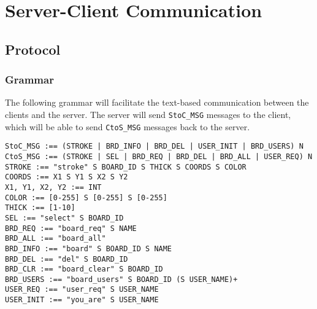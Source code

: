 \section{Server-Client Communication}

\subsection{Protocol}

\subsubsection{Grammar}
The following grammar will facilitate the text-based communication between the clients and the server. The server will send \texttt{StoC\_MSG} messages to the client, which will be able to send \texttt{CtoS\_MSG} messages back to the server.

\vspace{5mm}

\setlength{\parindent}{0in}

\texttt{StoC\_MSG :== (STROKE | BRD\_INFO | BRD\_DEL | USER\_INIT | BRD\_USERS) N}\\

\texttt{CtoS\_MSG :== (STROKE | SEL | BRD\_REQ | BRD\_DEL | BRD\_ALL | USER\_REQ) N}\\


\texttt{STROKE :== "stroke" S BOARD\_ID S THICK S COORDS S COLOR}\\
\texttt{COORDS :== X1 S Y1 S X2 S Y2}\\
\texttt{X1, Y1, X2, Y2 :== INT}\\
\texttt{COLOR :== [0-255] S [0-255] S [0-255]}\\
\texttt{THICK :== [1-10]}\\

\texttt{SEL :== "select" S BOARD\_ID}\\

\texttt{BRD\_REQ :== "board\_req" S NAME}\\
\texttt{BRD\_ALL :== "board\_all"}\\
\texttt{BRD\_INFO :== "board" S BOARD\_ID S NAME}\\
\texttt{BRD\_DEL :== "del" S BOARD\_ID}\\
\texttt{BRD\_CLR :== "board\_clear" S BOARD\_ID}\\
\texttt{BRD\_USERS :== "board\_users" S BOARD\_ID (S USER\_NAME)+}\\

\texttt{USER\_REQ :== "user\_req" S USER\_NAME}\\
\texttt{USER\_INIT :== "you\_are" S USER\_NAME}\\

